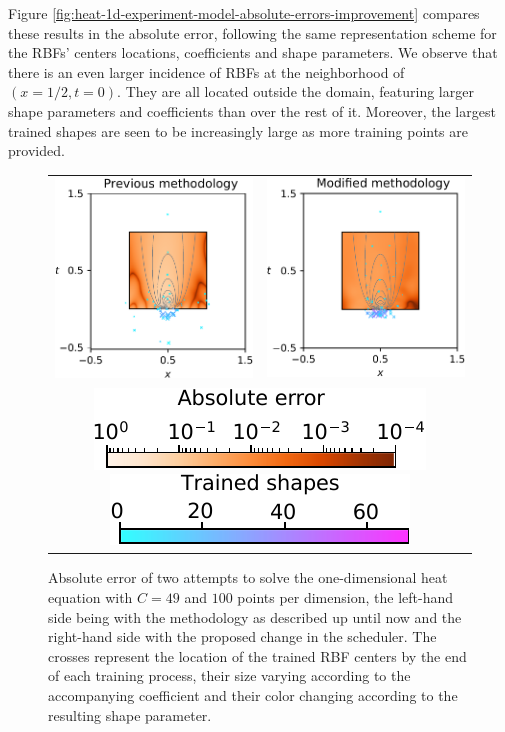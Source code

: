 \documentclass[12pt]{report} %
\begin{document}
Figure \ref{fig:heat-1d-experiment-model-absolute-errors-improvement} compares these results in the absolute error, following the same representation scheme for the RBFs' centers locations, coefficients and shape parameters. We observe that there is an even larger incidence of RBFs at the neighborhood of $(x=1/2,t=0)$. They are all located outside the domain, featuring larger shape parameters and coefficients than over the rest of it. Moreover, the largest trained shapes are seen to be increasingly large as more training points are provided.


\clearpage
\begin{figure}
\hspace*{-1cm}
\begin{tabular}{cc}
  {\includegraphics[width=.35\textwidth, clip=true,trim={0 0 0 0}]{imagenes/experiments/2d/heat_1d/49_100_bad.pdf}}  &
  {\includegraphics[width=.35\textwidth, clip=true,trim={0 0 0 0}]{imagenes/experiments/2d/heat_1d/49_100.pdf}} \\
  \multicolumn{2}{c}{\includegraphics[width=.3\textwidth]{imagenes/experiments/2d/heat_1d/49_100_colorbar_rotated.pdf} {\includegraphics[width=.3\textwidth]{imagenes/experiments/2d/heat_1d/trained_shapes_cbar.pdf}}}
\end{tabular}
\caption{Absolute error of two attempts to solve the one-dimensional heat equation with $C=49$ and $100$ points per dimension, the left-hand side being with the methodology as described up until now and the right-hand side with the proposed change in the scheduler. The crosses represent the location of the trained RBF centers by the end of each training process, their size varying according to the accompanying coefficient and their color changing according to the resulting shape parameter.}
\label{fig:heat-1d-experiment-model-absolute-errors}
\end{figure}
\end{document}
